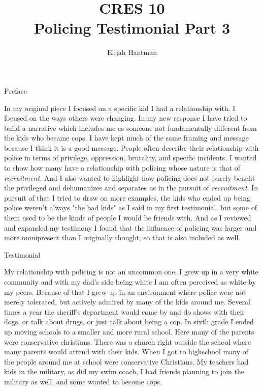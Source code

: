 \documentclass{report}
\title{\Huge{CRES 10}\\Policing Testimonial Part 3}
\author{\huge{Elijah Hantman}}
\date{}
\begin{document}
\maketitle
\newpage

\begin{center}
   \large Preface 
\end{center}
\begin{mdframed}
    In my original piece I focused on a specific kid I
    had a relationship with. I focused on the ways
    others were changing. In my new response I have tried
    to build a narrative which includes me as someone not
    fundamentally different from the kids who became cops.
    I have kept much of the same framing and message because
    I think it is a good message. People often describe their
    relationship with police in terms of privilege, oppression,
    brutality, and specific incidents. I wanted to show how
    many have a relationship with policing whose nature is that
    of \textit{recruitment}. And I also wanted to highlight
    how policing does not purely benefit the privileged and
    dehumanizes and separates us in the pursuit of \textit{recruitment}.
    In pursuit of that I tried to draw on more examples,
    the kids who ended up being police weren't always "the
    bad kids" as I said in my first testimonial, but some
    of them used to be the kinds of people I would be friends
    with. And as I reviewed and expanded my testimony I found 
    that the influence of policing was larger and more 
    omnipresent than I originally thought, so that is also 
    included as well.
\end{mdframed}
\begin{center}
    \large Testimonial 
\end{center}


My relationship with policing is not an uncommon one.
I grew up in a very white community and with my dad's side
being white I am often perceived as white by my peers.
Because of that I grew up in an environment where police
were not merely tolerated, but actively admired by many
of the kids around me. 
Several times a year the sheriff's department would 
come by and do shows with their dogs, or talk about drugs,
or just talk about being a cop. 
In sixth grade I ended up moving schools to a smaller and
more rural school. Here many of the parents were conservative
christians. There was a church right outside the school where
many parents would attend with their kids. When I got to highschool
many of the people around me at school were conservative Christians.
My teachers had kids in the military, as did my swim coach,
I had friends planning to join the military as well, and some
wanted to become cops. 
\end{document}
